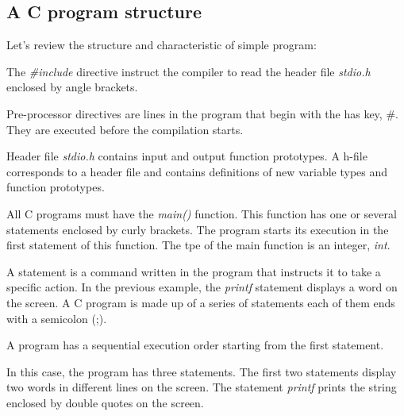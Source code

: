 \subsection{A C program structure}
Let's review the structure and characteristic of simple program:

\begin{program}
\end{program}

The \textit{\#include} directive instruct the compiler to read the header file \textit{stdio.h} enclosed by angle brackets. 

\begin{definition}
Pre-processor directives are lines in the program that begin with the has key, $\#$. They are executed before the compilation starts.
\end{definition}

Header file \textit{stdio.h} contains input and output function prototypes. A h-file corresponds to a header file and contains definitions of new variable types and function prototypes.

All C programs must have the \textit{main()} function. This function has one or several statements enclosed by curly brackets. The program starts its execution in the first statement of this function. The tpe of the main function is an integer, \textit{int}.

\begin{definition}
A statement is a command written in the program that instructs it to take a specific action. In the previous example, the \textit{printf} statement displays a word on the screen. A C program is made up of a series of statements each of them ends with a semicolon (;).
\end{definition}

A program has a sequential execution order starting from the first statement.

In this case, the program has three statements. The first two statements display two words in different lines on the screen. The statement \textit{printf} prints the string enclosed by double quotes on the screen.

